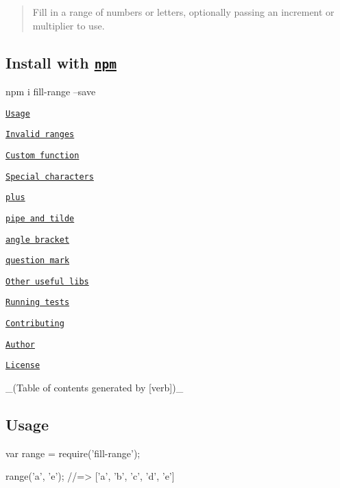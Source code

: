 \begin{quote}
Fill in a range of numbers or letters, optionally passing an increment or multiplier to use. \end{quote}


\subsection*{Install with \href{npmjs.org}{\tt npm}}


\begin{DoxyCode}
npm i fill-range --save
\end{DoxyCode}



\begin{DoxyItemize}
\item \href{#usage}{\tt Usage}
\begin{DoxyItemize}
\item \href{#invalid-ranges}{\tt Invalid ranges}
\item \href{#custom-function}{\tt Custom function}
\item \href{#special-characters}{\tt Special characters}
\begin{DoxyItemize}
\item \href{#plus}{\tt plus}
\item \href{#pipe-and-tilde}{\tt pipe and tilde}
\item \href{#angle-bracket}{\tt angle bracket}
\item \href{#question-mark}{\tt question mark}
\end{DoxyItemize}
\end{DoxyItemize}
\item \href{#other-useful-libs}{\tt Other useful libs}
\item \href{#running-tests}{\tt Running tests}
\item \href{#contributing}{\tt Contributing}
\item \href{#author}{\tt Author}
\item \href{#license}{\tt License}
\end{DoxyItemize}

\+\_\+(\+Table of contents generated by \mbox{[}verb\mbox{]})\+\_\+

\subsection*{Usage}


\begin{DoxyCode}
var range = require('fill-range');

range('a', 'e');
//=> ['a', 'b', 'c', 'd', 'e']
\end{DoxyCode}


